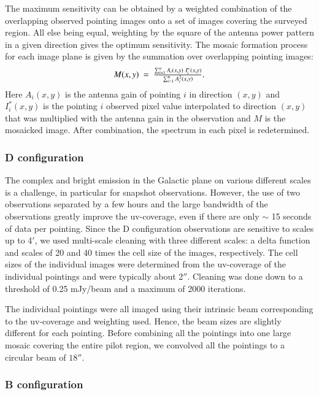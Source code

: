 \documentclass{aa}
\begin{document}
The maximum sensitivity can be obtained by a weighted combination of the overlapping observed pointing images onto a set of images covering the surveyed region. All else being equal, weighting by the square of the antenna
power pattern in a given direction gives the optimum sensitivity. The mosaic formation process for each image plane is given by the summation over overlapping pointing images:
\begin{equation}
  $$ M(x,y)\ =\ {{\sum_{i=1}^{n}A_{i}(x,y)\ I^*_{i}(x,y)}\over{\sum_{i=1}^{n}A^2_{i}(x,y)}}.$$
\end{equation}
Here $A_{i}(x,y)$ is the antenna gain of pointing $i$ in direction $(x,y)$ and $I^*_{i}(x,y)$ is the pointing $i$ observed pixel value
interpolated to direction $(x,y)$ that was multiplied with the antenna gain in the observation and $M$ is the mosaicked image. After combination, the spectrum in each pixel is redetermined. 

\subsubsection{D configuration}

The complex and bright emission in the Galactic plane on various different scales is a challenge, in particular
for snapshot observations. However, the use of two observations separated by a few hours and the large
bandwidth of the observations greatly improve the uv-coverage, even if there are only $\sim$ 15 seconds of
data per pointing. Since the D configuration observations are sensitive to scales up to 4$'$, we used
multi-scale cleaning with three different scales: a delta function and scales of 20 and 40 times the cell size of
the images, respectively. The cell sizes of the individual images were determined from the uv-coverage of the
individual pointings and were typically about 2$''$. Cleaning was done down to a threshold of 0.25 mJy/beam
and a maximum of 2000 iterations.

The individual pointings were all imaged using their intrinsic beam corresponding to the uv-coverage and weighting
used. Hence, the beam sizes are slightly different for each pointing. Before combining all the pointings into one
large mosaic covering the entire pilot region, we convolved all the pointings to a circular beam of $18''$.




\subsubsection{B configuration}
\end{document}
